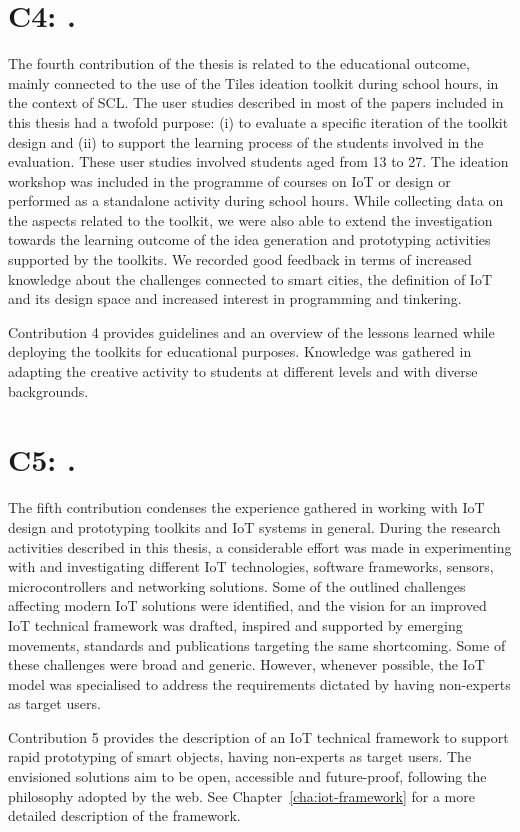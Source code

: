 \section[C4: \Civ][Contribution 4]{C4: \Civ.}
\label{c4}

The fourth contribution of the thesis is related to the educational outcome, mainly connected to the use of the Tiles ideation toolkit during school hours, in the context of SCL. The user studies described in most of the papers included in this thesis had a twofold purpose: (i) to evaluate a specific iteration of the toolkit design and (ii) to support the learning process of the students involved in the evaluation. These user studies involved students aged from 13 to 27. The ideation workshop was included in the programme of courses on IoT or design or performed as a standalone activity during school hours.
While collecting data on the aspects related to the toolkit, we were also able to extend the investigation towards the learning outcome of the idea generation and prototyping activities supported by the toolkits. We recorded good feedback in terms of increased knowledge about the challenges connected to smart cities, the definition of IoT and its design space and increased interest in programming and tinkering.

Contribution 4 provides guidelines and an overview of the lessons learned while deploying the toolkits for educational purposes. Knowledge was gathered in adapting the creative activity to students at different levels and with diverse backgrounds.


\section[C5: \Cv][Contribution 5]{C5: \Cv.}
\label{c5}

The fifth contribution condenses the experience gathered in working with IoT design and prototyping toolkits and IoT systems in general. During the research activities described in this thesis, a considerable effort was made in experimenting with and investigating different IoT technologies, software frameworks, sensors, microcontrollers and networking solutions. Some of the outlined challenges affecting modern IoT solutions were identified, and the vision for an improved IoT technical framework was drafted, inspired and supported by emerging movements, standards and publications targeting the same shortcoming. Some of these challenges were broad and generic. However, whenever possible, the IoT model was specialised to address the requirements dictated by having non-experts as target users.

Contribution 5 provides the description of an IoT technical framework to support rapid prototyping of smart objects, having non-experts as target users. The envisioned solutions aim to be open, accessible and future-proof, following the philosophy adopted by the web. See Chapter~\ref{cha:iot-framework} for a more detailed description of the framework.